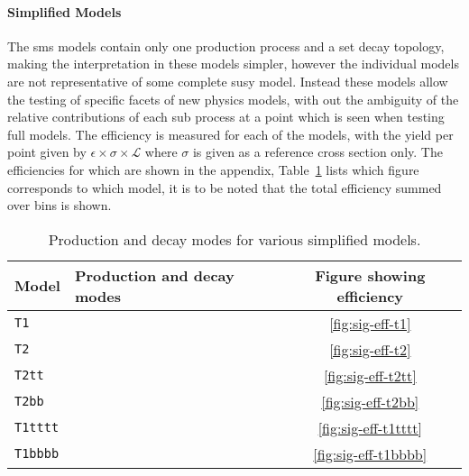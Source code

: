 \paragraph{Simplified Models} %
\label{par:simplified_models}
The \ac{sms} models contain only one production process and a set decay 
topology, making the interpretation in these models simpler, however the 
individual models are not representative of some complete \ac{susy} model. 
Instead these models allow the testing of specific facets of new physics 
models, with out the ambiguity of the relative contributions of each sub 
process at a point which is seen when testing full models. The efficiency is 
measured for each of the models, with the yield per point given by 
$\epsilon\times\sigma\times\mathcal{L}$ where $\sigma$ is given as a reference 
cross section only. The efficiencies for which are shown in the appendix, 
Table~\ref{tab:sms-eff} lists which figure corresponds to which model, it is to 
be noted that the total efficiency summed over \HT bins is shown.



\begin{table}[h!]
  \caption{Production and decay modes for various simplified models.}
  \label{tab:sms-eff}
  \centering
  \footnotesize
  \begin{tabular}{ llc }
    \hline
    Model & Production and decay modes & Figure showing efficiency \\ [0.5ex]
    \hline
    \texttt{T1} & \HepProcess{\PSgluino\PSgluino\to\Pquark\APquark\PSneutralino\Pquark\APquark\PSneutralino} & \ref{fig:sig-eff-t1} \\
    \texttt{T2} & \HepProcess{\Psquark\Psquark\to\Pquark\PSneutralino\APquark\PSneutralino} & \ref{fig:sig-eff-t2} \\
    \texttt{T2tt} & \HepProcess{\PStop\PStop\to\Ptop\PSneutralino\APtop\PSneutralino}
& \ref{fig:sig-eff-t2tt} \\
    \texttt{T2bb} & \HepProcess{\PSbottom\PSbottom\to\Pbottom\PSneutralino\APbottom\PSneutralino} & \ref{fig:sig-eff-t2bb} \\
    \texttt{T1tttt} & \HepProcess{\PSgluino\PSgluino\to\Ptop\APtop\PSneutralino\Ptop\APtop\PSneutralino} & \ref{fig:sig-eff-t1tttt} \\
    \texttt{T1bbbb} & \HepProcess{\PSgluino\PSgluino\to\Pbottom\APbottom\PSneutralino\Pbottom\APbottom\PSneutralino} & \ref{fig:sig-eff-t1bbbb} \\
    \hline
  \end{tabular}
\end{table}


